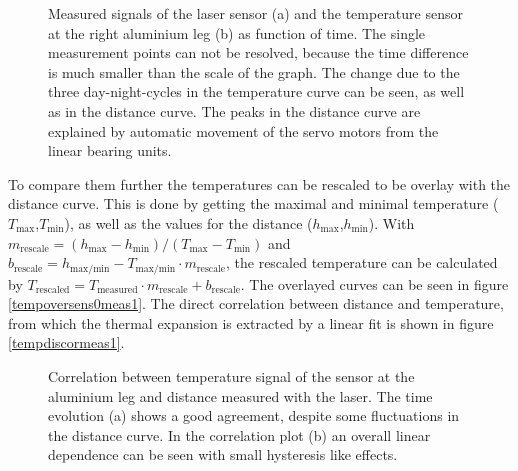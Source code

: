 \documentclass[
a4paper,                                %
twoside,                                %
BCOR1.4cm,                      %
10pt,                           %
headings=normal,                %
headsepline,                    %
clearplainpage, %
final,                                  %
div=14,
parskip=full,
openright,
bibliography=toc
]{scrreprt}
\begin{document}
\begin{figure}[H]	
	\centering
	\qquad
	\caption{Measured signals of the laser sensor (a) and the temperature sensor at the right aluminium leg (b) as function of time. The single measurement points can not be resolved, because the time difference is much smaller than the scale of the graph. The change due to the three day-night-cycles in the temperature curve can be seen, as well as in the distance curve. The peaks in the distance curve are explained by automatic movement of the servo motors from the linear bearing units.}
	\label{disandtempvstime}
\end{figure}

To compare them further the temperatures can be rescaled to be overlay with the distance curve. This is done by getting the maximal and minimal temperature ($ T_{\mathrm{max}} $,$ T_{\mathrm{min}} $), as well as the values for the distance ($ h_{\mathrm{max}} $,$ h_{\mathrm{min}} $). With $ m_{\mathrm{rescale}} = (h_{\mathrm{max}} - h_{\mathrm{min}})/(T_{\mathrm{max}} - T_{\mathrm{min}}) $ and $ b_{\mathrm{rescale}} = h_{\mathrm{max/min}} - T_{\mathrm{max/min}} \cdot m_{\mathrm{rescale}} $, the rescaled temperature can be calculated by $ T_{\mathrm{rescaled}} = T_{\mathrm{measured}} \cdot m_{\mathrm{rescale}} + b_{\mathrm{rescale}} $. The overlayed curves can be seen in figure \ref{tempoversens0meas1}. The direct correlation between distance and temperature, from which the thermal expansion is extracted by a linear fit is shown in figure \ref{tempdiscormeas1}.

\begin{figure}[H]	
	\centering
	\qquad
	\caption{Correlation between temperature signal of the sensor at the aluminium leg and distance measured with the laser. The time evolution (a) shows a good agreement, despite some fluctuations in the distance curve. In the correlation plot (b) an overall linear dependence can be seen with small hysteresis like effects.}
	\label{tempdismeas1}
\end{figure}
\end{document}
